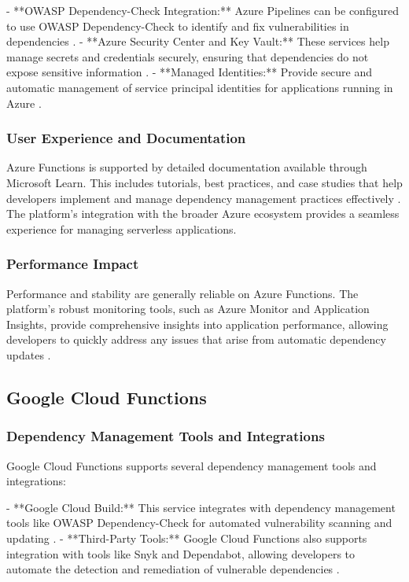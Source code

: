 \documentclass[sigconf]{acmart}
\begin{document}
- **OWASP Dependency-Check Integration:** Azure Pipelines can be configured to use OWASP Dependency-Check to identify and fix vulnerabilities in dependencies \cite{azureowasp2023}.
- **Azure Security Center and Key Vault:** These services help manage secrets and credentials securely, ensuring that dependencies do not expose sensitive information \cite{azureSecurity2023}.
- **Managed Identities:** Provide secure and automatic management of service principal identities for applications running in Azure \cite{azureManagedIdentities2023}.

\subsubsection{User Experience and Documentation}

Azure Functions is supported by detailed documentation available through Microsoft Learn. This includes tutorials, best practices, and case studies that help developers implement and manage dependency management practices effectively \cite{azureLearn2023}. The platform's integration with the broader Azure ecosystem provides a seamless experience for managing serverless applications.

\subsubsection{Performance Impact}

Performance and stability are generally reliable on Azure Functions. The platform's robust monitoring tools, such as Azure Monitor and Application Insights, provide comprehensive insights into application performance, allowing developers to quickly address any issues that arise from automatic dependency updates \cite{azurePerformance2023}.

\subsection{Google Cloud Functions}

\subsubsection{Dependency Management Tools and Integrations}

Google Cloud Functions supports several dependency management tools and integrations:

- **Google Cloud Build:** This service integrates with dependency management tools like OWASP Dependency-Check for automated vulnerability scanning and updating \cite{googleBuild2023}.
- **Third-Party Tools:** Google Cloud Functions also supports integration with tools like Snyk and Dependabot, allowing developers to automate the detection and remediation of vulnerable dependencies \cite{googlesnyk2023}.
\end{document}
